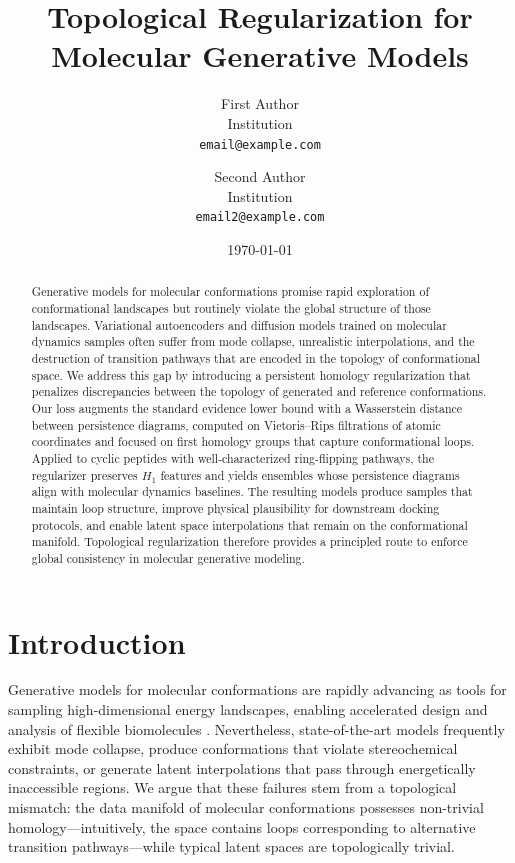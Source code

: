 \documentclass[11pt]{article}
\title{Topological Regularization for Molecular Generative Models}
\author{First Author\\Institution\\\texttt{email@example.com} \and Second Author\\Institution\\\texttt{email2@example.com}}
\date{\today}
\begin{document}
\maketitle

\begin{abstract}
Generative models for molecular conformations promise rapid exploration of conformational landscapes but routinely violate the global structure of those landscapes. Variational autoencoders and diffusion models trained on molecular dynamics samples often suffer from mode collapse, unrealistic interpolations, and the destruction of transition pathways that are encoded in the topology of conformational space. We address this gap by introducing a persistent homology regularization that penalizes discrepancies between the topology of generated and reference conformations. Our loss augments the standard evidence lower bound with a Wasserstein distance between persistence diagrams, computed on Vietoris--Rips filtrations of atomic coordinates and focused on first homology groups that capture conformational loops. Applied to cyclic peptides with well-characterized ring-flipping pathways, the regularizer preserves $H_1$ features and yields ensembles whose persistence diagrams align with molecular dynamics baselines. The resulting models produce samples that maintain loop structure, improve physical plausibility for downstream docking protocols, and enable latent space interpolations that remain on the conformational manifold. Topological regularization therefore provides a principled route to enforce global consistency in molecular generative modeling.
\end{abstract}

\section{Introduction}
Generative models for molecular conformations are rapidly advancing as tools for sampling high-dimensional energy landscapes, enabling accelerated design and analysis of flexible biomolecules \cite{noe2019boltzmann, trippe2023diffusion}. Nevertheless, state-of-the-art models frequently exhibit mode collapse, produce conformations that violate stereochemical constraints, or generate latent interpolations that pass through energetically inaccessible regions. We argue that these failures stem from a topological mismatch: the data manifold of molecular conformations possesses non-trivial homology---intuitively, the space contains loops corresponding to alternative transition pathways---while typical latent spaces are topologically trivial.
\end{document}
